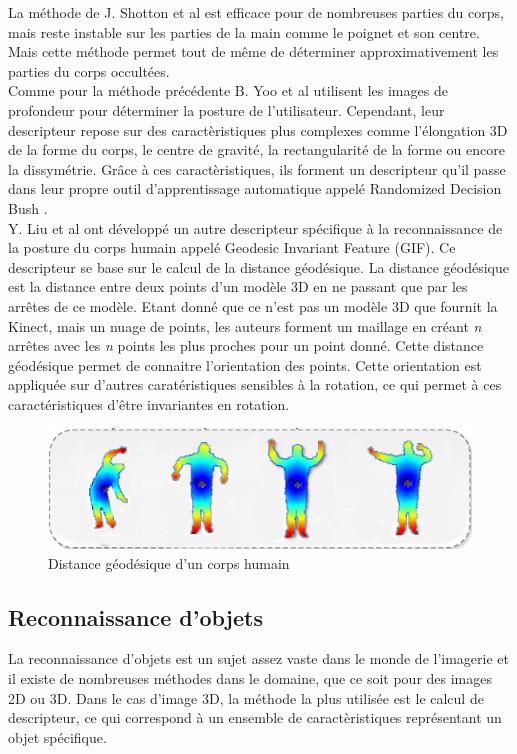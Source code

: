 La méthode de J. Shotton et al\cite{kinectSegmentation} est efficace pour de nombreuses parties du corps, 
mais reste instable sur les parties de la main comme le poignet et son centre. Mais cette méthode permet 
tout de même de déterminer approximativement les parties du corps occultées.\\

Comme pour la méthode précédente B. Yoo et al\cite{RDB} utilisent les images de profondeur pour déterminer
la posture de l'utilisateur. Cependant, leur descripteur repose sur des caractèristiques plus complexes comme
l'élongation 3D de la forme du corps, le centre de gravité, la rectangularité de la forme ou encore la 
dissymétrie. Grâce à ces caractèristiques, ils forment un descripteur qu'il passe dans leur propre outil
d'apprentissage automatique appelé \og Randomized Decision Bush \fg.\\

Y. Liu et al\cite{GIF} ont développé un autre descripteur spécifique à la reconnaissance de la posture du corps
humain appelé \og Geodesic Invariant Feature \fg(GIF). 
Ce descripteur se base sur le calcul de la distance géodésique. La distance géodésique est la distance
entre deux points d'un modèle 3D en ne passant que par les arrêtes de ce modèle. Etant donné que ce n'est pas un
modèle 3D que fournit la Kinect, mais un nuage de points, les auteurs forment un maillage en créant \textit{n} arrêtes avec
les \textit{n} points les plus proches pour un point donné. Cette distance géodésique permet de connaitre l'orientation
des points. Cette orientation est appliquée sur d'autres caratéristiques sensibles à la rotation, ce qui permet
à ces caractéristiques d'être invariantes en rotation. 

\begin{figure}[!ht]
  \begin{center}
    \includegraphics[width=12cm]{image/geodesic.png}
    \caption{Distance géodésique d'un corps humain}
  \end{center}
\end{figure}

\subsection{Reconnaissance d'objets}
La reconnaissance d'objets est un sujet assez vaste dans le monde de l'imagerie et il existe de nombreuses
méthodes dans le domaine, que ce soit pour des images 2D ou 3D. Dans le cas d'image 3D, la méthode la plus utilisée
est le calcul de descripteur, ce qui correspond à un ensemble de caractèristiques représentant un objet spécifique.

